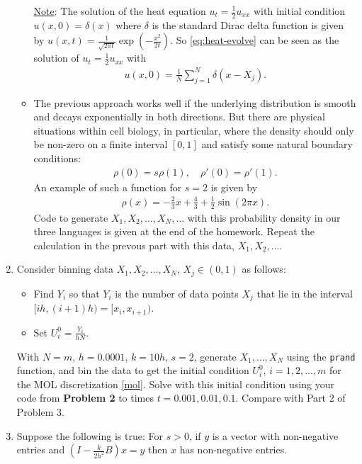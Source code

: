 \documentclass[10pt]{amsart}
\begin{document}
\begin{enumerate}[label={\bf Problem~{\arabic*}:}]
\begin{itemize}
  \underline{Note}:  The solution of the heat equation $u_t = \frac 1 2 u_{xx}$ with initial condition $u(x,0) = \delta(x)$ where $\delta$ is the standard Dirac delta function is given by $u(x,t) = \frac{1}{\sqrt{2 \pi t}} \exp \left( - \frac{x^2}{2t} \right)$.  So \eqref{eq:heat-evolve} can be seen as the solution of $u_t = \frac 1 2 u_{xx}$ with
  \begin{align*}
    u(x,0) = \frac{1}{N} \sum_{j=1}^N \delta(x-X_j).
  \end{align*}

\item The previous approach works well if the underlying distribution is smooth and decays exponentially in both directions.  But there are physical situations within cell biology, in particular, where the density should only be non-zero on a finite interval $[0,1]$ and satisfy some natural boundary conditions:
  \begin{align*}
    \rho(0) = s \rho(1), \quad \rho'(0) = \rho'(1).
  \end{align*}
  An example of such a function for $s = 2$ is given by
  \begin{align*}
    \rho(x) = - \frac 2 3 x + \frac 4 3 + \frac 1 2 \sin(2 \pi x).
  \end{align*}
  Code to generate $X_1,X_2,\ldots,X_N,\ldots$ with this probability density in our three languages is given at the end of the homework.  Repeat the calculation in the prevous part with this data, $X_1,X_2,\ldots$.
    
\end{itemize}
\mline
\item Consider binning data $X_1,X_2,\ldots,X_N$, $X_j \in (0,1)$ as follows:
  \begin{itemize}
  \item Find $Y_i$ so that $Y_i$ is the number of data points $X_j$ that lie in the interval $[ih,(i+1)h) = [x_i,x_{i+1})$.
  \item Set $U_i^0 = \frac{Y_i}{h N}$.
  \end{itemize}
  With $N = m$, $h = 0.0001$, $k = 10h$, $s = 2$, generate $X_1,\ldots,X_N$ using the {\tt prand} function, and bin the data to get the initial condition $U_i^0$, $i = 1,2,\ldots,m$ for the MOL discretization \eqref{mol}.  Solve with this initial condition using your code from {\textbf{Problem 2}} to times $t = 0.001,0.01,0.1$.  Compare with Part 2 of Problem 3.

\mline
  
\item   Suppose the following is true: For $s > 0$, if $y$ is a vector with non-negative entries and $\left( I - \frac{k}{2h^2}B \right) x = y$ then $x$ has non-negative entries. \\


\end{enumerate}
\end{document}
